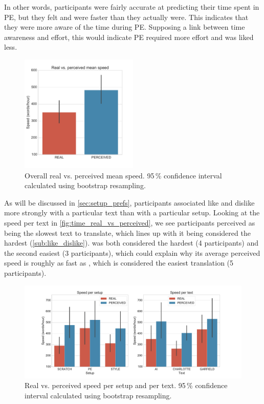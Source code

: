 In other words, participants were fairly accurate at predicting their time spent in \ac{PE}, but they felt \scratch and \style were faster than they actually were. This indicates that they were more aware of the time during \ac{PE}. Supposing a link between time awareness and effort, this would indicate \ac{PE} required more effort and was liked less.

\begin{figure}[h]
\myfloatalign
\includegraphics[width=0.5\textwidth]{img/time/time_overall}
\caption{Overall real vs. perceived mean speed. 95\,\% confidence interval calculated using bootstrap resampling.}
\label{fig:time_overall}
\end{figure}

As will be discussed in \autoref{sec:setup_prefs}, participants associated like and dislike more strongly with a particular text than with a particular setup. Looking at the speed per text in \autoref{fig:time_real_vs_perceived}, we see participants perceived \charlotte as being the slowest text to translate, which lines up with it being considered the hardest (\autoref{sub:like_dislike}). \ai was both considered the hardest (4 participants) and the second easiest (3 participants), which could explain why its average perceived speed is roughly as fast as , which is considered the easiest translation (5 participants). 

\begin{figure}
\includegraphics[width=\textwidth]{img/time/time_real_vs_perceived}
\caption{Real vs. perceived speed per setup and per text. 95\,\% confidence interval calculated using bootstrap resampling.}
\label{fig:time_real_vs_perceived}
\end{figure}

